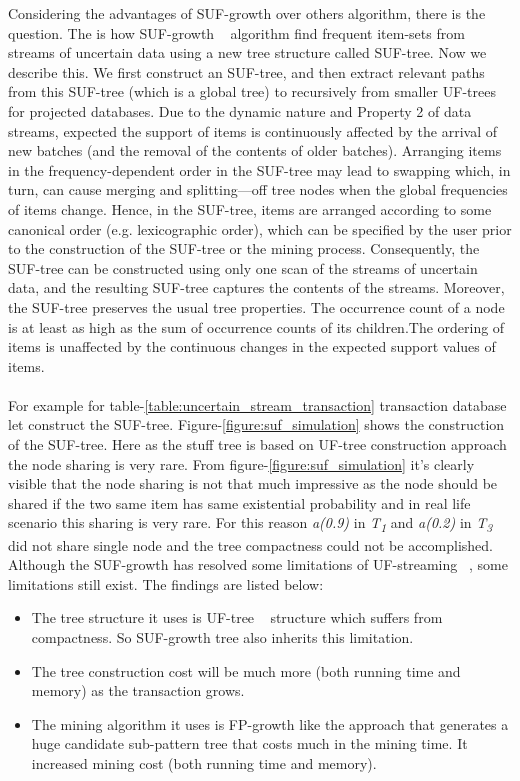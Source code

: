     Considering the advantages of SUF-growth over others algorithm, there is the question. The is how SUF-growth ~\cite{suf_growth} algorithm find frequent item-sets from streams of uncertain data using a new tree structure called SUF-tree. Now we describe this. We ﬁrst construct an SUF-tree, and then extract relevant paths from this SUF-tree (which is a global tree) to recursively from smaller UF-trees for projected databases. Due to the dynamic nature and Property 2 of data streams, expected the support of items is continuously affected by the arrival of new batches (and the removal of the contents of older batches). Arranging items in the frequency-dependent order in the SUF-tree may lead to swapping which, in turn, can cause merging and splitting—off tree nodes when the global frequencies of items change. Hence, in the SUF-tree, items are arranged according to some canonical order (e.g. lexicographic order), which can be speciﬁed by the user prior to the construction of the SUF-tree or the mining process. Consequently, the SUF-tree can be constructed using only one scan of the streams of uncertain data, and the resulting SUF-tree captures the contents of the streams. Moreover, the SUF-tree preserves the usual tree properties. The occurrence count of a node is at least as high as the sum of occurrence counts of its children.The ordering of items is unaffected by the continuous changes in the expected support values of items.\\ \\
    For example for table-\ref{table:uncertain_stream_transaction} transaction database let construct the SUF-tree. Figure-\ref{figure:suf_simulation} shows the construction of the SUF-tree. Here as the stuff tree is based on UF-tree construction approach the node sharing is very rare. From figure-\ref{figure:suf_simulation} it’s clearly visible that the node sharing is not that much impressive as the node should be shared if the two same item has same existential probability and in real life scenario this sharing is very rare. For this reason \emph{a(0.9)} in \emph{T\textsubscript{1}} and \emph{a(0.2)} in \emph{T\textsubscript{3}} did not share single node and the tree compactness could not be accomplished.
    Although the SUF-growth has resolved some limitations of UF-streaming ~\cite{suf_growth}, some limitations still exist. The findings are listed below:
    \begin{itemize}
        \item The tree structure it uses is UF-tree ~\cite{uf_growth} structure which suffers from compactness. So SUF-growth tree also inherits this limitation.
        \item The tree construction cost will be much more (both running time and memory) as the transaction grows.
        \item The mining algorithm it uses is FP-growth like the approach that generates a huge candidate sub-pattern tree that costs much in the mining time. It increased mining cost (both running time and memory).
     \end{itemize}
    
